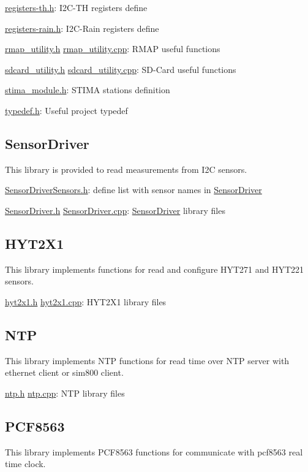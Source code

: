 \hyperlink{registers-th_8h}{registers-\/th.\+h}\+: I2\+C-\/\+TH register\textquotesingle{}s define

\hyperlink{registers-rain_8h}{registers-\/rain.\+h}\+: I2\+C-\/\+Rain register\textquotesingle{}s define

\hyperlink{rmap__utility_8h}{rmap\+\_\+utility.\+h} \hyperlink{rmap__utility_8cpp}{rmap\+\_\+utility.\+cpp}\+: R\+M\+AP useful functions

\hyperlink{sdcard__utility_8h}{sdcard\+\_\+utility.\+h} \hyperlink{sdcard__utility_8cpp}{sdcard\+\_\+utility.\+cpp}\+: S\+D-\/\+Card useful functions

\hyperlink{stima__module_8h}{stima\+\_\+module.\+h}\+: S\+T\+I\+MA station\textquotesingle{}s definition

\hyperlink{typedef_8h}{typedef.\+h}\+: Useful project typedef\hypertarget{index_sensordriver}{}\subsection{Sensor\+Driver}\label{index_sensordriver}
This library is provided to read measurements from I2C sensors.

\hyperlink{SensorDriverSensors_8h}{Sensor\+Driver\+Sensors.\+h}\+: define list with sensor names in \hyperlink{classSensorDriver}{Sensor\+Driver}

\hyperlink{SensorDriver_8h}{Sensor\+Driver.\+h} \hyperlink{SensorDriver_8cpp}{Sensor\+Driver.\+cpp}\+: \hyperlink{classSensorDriver}{Sensor\+Driver} library files\hypertarget{index_hyt2x1}{}\subsection{H\+Y\+T2\+X1}\label{index_hyt2x1}
This library implements functions for read and configure H\+Y\+T271 and H\+Y\+T221 sensors.

\hyperlink{hyt2x1_8h}{hyt2x1.\+h} \hyperlink{hyt2x1_8cpp}{hyt2x1.\+cpp}\+: H\+Y\+T2\+X1 library files\hypertarget{index_ntp}{}\subsection{N\+TP}\label{index_ntp}
This library implements N\+TP functions for read time over N\+TP server with ethernet client or sim800 client.

\hyperlink{ntp_8h}{ntp.\+h} \hyperlink{ntp_8cpp}{ntp.\+cpp}\+: N\+TP library files\hypertarget{index_pcf8563}{}\subsection{P\+C\+F8563}\label{index_pcf8563}
This library implements P\+C\+F8563 functions for communicate with pcf8563 real time clock.

